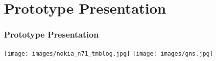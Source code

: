 \documentclass[blue]{beamer}
\begin{document}

\section{Prototype Presentation}
\frame
{
\frametitle{\textbf{Prototype Presentation}}
\texttt{[image: images/nokia\_n71\_tmblog.jpg]}
\texttt{[image: images/gns.jpg]}
}


\end{document}
